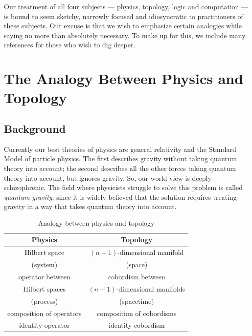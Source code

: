 \documentclass[12pt,twoside,openright]{report}
\begin{document}
Our treatment of all four subjects --- physics, topology, logic and computation --- is bound to seem sketchy, narrowly focused and idiosyncratic to practitioners of these subjects.  Our excuse is that we wish to emphasize certain analogies while saying no more than absolutely necessary.  To make up for this, we include many references for those who wish to dig deeper.

\section{The Analogy Between Physics and Topology}
\label{physics_topology}

\subsection{Background}
\label{ptbackground}

Currently our best theories of physics are general relativity and the Standard Model of particle physics.  The first describes gravity without taking quantum theory into account; the second describes all the other forces taking quantum theory into account, but ignores gravity.  So, our world-view is deeply schizophrenic. The field where physicists struggle to solve this problem is called {\em quantum gravity}, since it is widely believed that the solution requires treating gravity in a way that takes quantum theory into account.

\begin{table}[h]
\begin{center}
\begin{tabular}{|c|c|}                    \hline Physics                           &  Topology \\  \hline Hilbert space                     &  $(n-1)$-dimensional manifold       \\  
(system)                          & (space)             \\  \hline operator between                  &  cobordism between  \\
Hilbert spaces                    & $(n-1)$-dimensional manifolds \\
(process)                         &  (spacetime)           \\  \hline composition of operators          &  composition of cobordisms \\  \hline identity operator                 &  identity cobordism \\  \hline
\end{tabular} 
\\
\caption{Analogy between physics and topology}
\label{analogy2}
\end{center}
\end{table}
\end{document}
